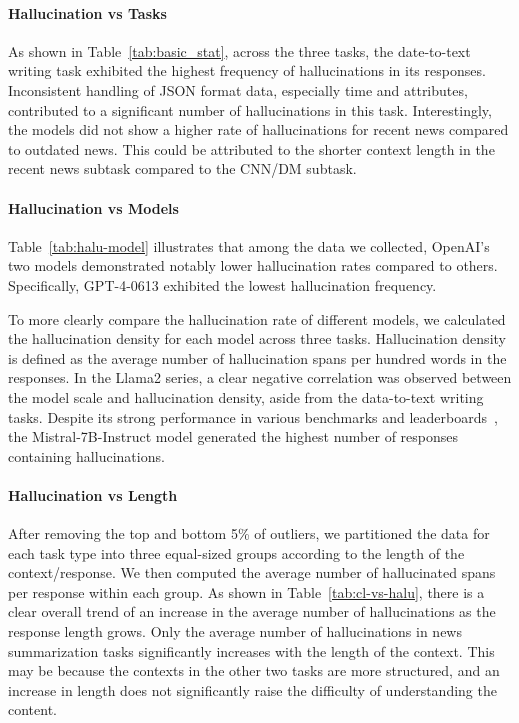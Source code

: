 \documentclass[11pt]{article}
\begin{document}
\paragraph{Hallucination vs Tasks} As shown in Table~\ref{tab:basic_stat}, across the three tasks, the date-to-text writing task exhibited the highest frequency of hallucinations in its responses. 
Inconsistent handling of JSON format data, especially time and attributes, contributed to a significant number of hallucinations in this task. 
Interestingly, the models did not show a higher rate of hallucinations for recent news compared to outdated news. This could be attributed to the shorter context length in the recent news subtask compared to the CNN/DM subtask.




\paragraph{Hallucination vs Models} Table~\ref{tab:halu-model} illustrates that among the data we collected, OpenAI's two models demonstrated notably lower hallucination rates compared to others. Specifically, GPT-4-0613 exhibited the lowest hallucination frequency. 

To more clearly compare the hallucination rate of different models, we calculated the hallucination density for each model across three tasks. Hallucination density is defined as the average number of hallucination spans per hundred words in the responses. In the Llama2 series, a clear negative correlation was observed between the model scale and hallucination density, aside from the data-to-text writing tasks. Despite its strong performance in various benchmarks and leaderboards~\cite{zheng2023judging}, 
the Mistral-7B-Instruct model generated the highest number of responses containing hallucinations.

\paragraph{Hallucination vs Length} After removing the top and bottom 5\% of outliers, we partitioned the data for each task type into three equal-sized groups according to the length of the context/response. We then computed the average number of hallucinated spans per response within each group. As shown in Table~\ref{tab:cl-vs-halu}, there is a clear overall trend of an increase in the average number of hallucinations as the response length grows. Only the average number of hallucinations in news summarization tasks significantly increases with the length of the context. This may be because the contexts in the other two tasks are more structured, and an increase in length does not significantly raise the difficulty of understanding the content.
\end{document}
